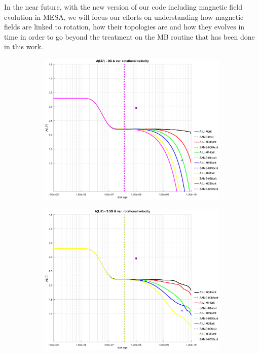 \documentclass[fleqn,usenatbib]{mnras}
\begin{document}
In the near future, with the new version of our code including magnetic field evolution in MESA, we will focus our efforts on understanding how magnetic fields are linked to rotation, how their topologies are and how they evolves in time in order to go beyond the treatment on the MB routine that has been done in this work.\par




\begin{figure}
    \centering
    \begin{subfigure}[h]{0.47\textwidth}
    \includegraphics[trim = 40mm 15mm 20mm 15mm, clip,width=\textwidth]{figures/li_var_vel_0_0g.eps}
    \label{fig:subim1}
    \end{subfigure}
    \begin{subfigure}[h]{0.47\textwidth}
    \includegraphics[trim = 40mm 15mm 20mm 15mm, clip,width=\textwidth]{figures/li_var_vel_3_5g.eps}
    \label{fig:subim2}
    \end{subfigure}
    

\end{figure}
\end{document}
